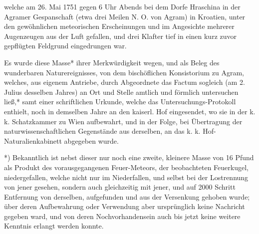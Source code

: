 \documentclass[a4paper, 11pt, oneside, german]{article}
\begin{document}
welche am 26. Mai 1751 gegen 6 Uhr Abends bei dem Dorfe Hraschina in der Agramer Gespanschaft (etwa drei Meilen N. O. von Agram) in Kroatien, unter den gewöhnlichen meteorischen Erscheinungen und im Angesichte mehrerer Augenzeugen aus der Luft gefallen, und drei Klafter tief in einen kurz zuvor gepflügten Feldgrund eingedrungen war.

Es wurde diese Masse* ihrer Merkwürdigkeit wegen, und als Beleg des wunderbaren Naturereignisses, von dem bischöflichen Konsistorium zu Agram, welches, aus eigenem Antriebe, durch Abgeordnete das Factum sogleich (am 2. Julius desselben Jahres) an Ort und Stelle amtlich und förmlich untersuchen ließ,* samt einer schriftlichen Urkunde, welche das Untersuchungs-Protokoll enthielt, noch in demselben Jahre an den kaiserl. Hof eingesendet, wo sie in der k. k. Schatzkammer zu Wien aufbewahrt, und in der Folge, bei Übertragung der naturwissenschaftlichen Gegenstände aus derselben, an das k. k. Hof-Naturalienkabinett abgegeben wurde.

*) Bekanntlich ist nebst dieser nur noch eine zweite, kleinere Masse von 16 Pfund als Produkt des vorausgegangenen Feuer-Meteors, der beobachteten Feuerkugel, niedergefallen, welche nicht nur im Niederfallen, und selbst bei der Lostrennung von jener gesehen, sondern auch gleichzeitig mit jener, und auf 2000 Schritt Entfernung von derselben, aufgefunden und aus der Versenkung gehoben wurde; über deren Aufbewahrung oder Verwendung aber ursprünglich keine Nachricht gegeben ward, und von deren Nochvorhandensein auch bis jetzt keine weitere Kenntnis erlangt werden konnte.
\end{document}
